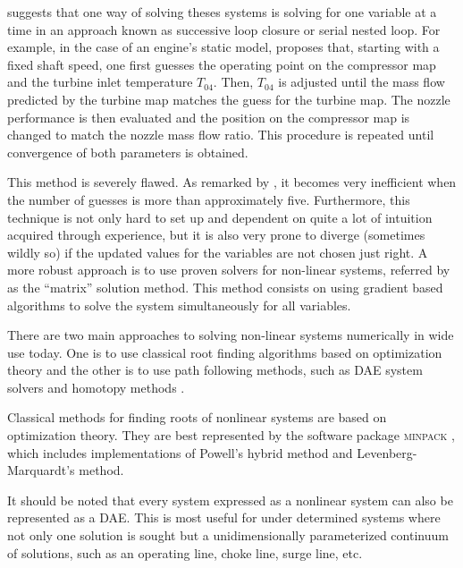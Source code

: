 \documentclass[tcc]{subfiles}
\begin{document}
\textcite{walsh2004gas} suggests that one way of solving theses systems is solving for one variable at a time in an approach known as successive loop closure or serial nested loop. 
For example, in the case of an engine's static model, \textcite{walsh2004gas} proposes that, starting with a fixed shaft speed, one first guesses the operating point on the compressor map and the turbine inlet temperature $T_{04}$. Then, $T_04$ is adjusted until the mass flow predicted by the turbine map matches the guess for the turbine map. The nozzle performance is then evaluated and the position on the compressor map is changed to match the nozzle mass flow ratio. This procedure is repeated until convergence of both parameters is obtained.

This method is severely flawed. As remarked by \textcite{walsh2004gas}, it becomes very inefficient when the number of guesses is more than approximately five. Furthermore, this technique is not only hard to set up and dependent on quite a lot of intuition acquired through experience, but it is also very prone to diverge (sometimes wildly so) if the updated values for the variables are not chosen just right. A more robust approach is to use proven solvers for non-linear systems, referred by \textcite{walsh2004gas} as the ``matrix'' solution method. 
This method consists on using gradient based algorithms to solve the system simultaneously for all variables.

There are two main approaches to solving non-linear systems numerically in wide use today. 
One is to use classical root finding algorithms based on optimization theory 
and the other is to use path following methods, such as
\ac{DAE} system solvers and homotopy methods \cite{Allgower1997,Rabier2002,hompack,sundials}. 

Classical methods for finding roots of nonlinear systems are based on optimization theory. 
They are best represented by the software package \textsc{minpack} \cite{minpack}, which includes implementations of Powell's hybrid method and Levenberg-Marquardt's method.

It should be noted that every system expressed as a nonlinear system can also be represented as a \ac{DAE}. 
This is most useful for under determined systems where not only one solution is sought 
but a unidimensionally parameterized continuum of solutions, such as an operating line, 
choke line, surge line, etc.
\end{document}
